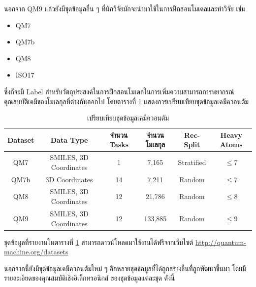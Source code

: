 นอกจาก QM9 แล้วยังมีชุดข้อมูลอื่น ๆ ที่นักวิจัยมักจะนำมาใช้ในการฝึกสอนโมเดลและทำวิจัย เช่น 

\begin{itemize}[topsep=0pt]
    \item QM7\autocite{blum2009,rupp2012}
    
    \item QM7b\autocite{blum2009,montavon2013}
    
    \item QM8\autocite{ruddigkeit2012,ramakrishnan2015}
    
    \item ISO17\autocite{schutt2017,schutt2017a,ramakrishnan2014}
\end{itemize}

\noindent ซึ่งก็จะมี Label สำหรับวัตถุประสงค์ในการฝึกสอนโมเดลในการเพิ่มความสามารถการพยากรณ์คุณสมบัติเคมีของโมเลกุลที่ต่างกันออกไป 
โดยตารางที่ \ref{tab:compare_qm_dataset} แสดงการเปรียบเทียบชุดข้อมูลเคมีควอนตัม

\begin{table}[H]
    \centering
    \caption{เปรียบเทียบชุดข้อมูลเคมีควอนตัม}
    \label{tab:compare_qm_dataset}
    \begin{tabular}{cccccc}
    \toprule
    \textbf{Dataset} &\textbf{Data Type} &\textbf{จำนวน Tasks} &\textbf{จำนวนโมเลกุล} 
    &\textbf{Rec-Split} &\textbf{Heavy Atoms} \\
    \midrule
    QM7 &SMILES, 3D Coordinates &1 &7,165 &Stratified &$\leq$7 \\
    QM7b &3D Coordinates &14 &7,211 &Random &$\leq$7 \\
    QM8 &SMILES, 3D Coordinates &12 &21,786 &Random &$\leq$8 \\
    QM9 &SMILES, 3D Coordinates &12 &133,885 &Random &$\leq$9 \\
    \bottomrule
    \end{tabular}
\end{table}

ชุดข้อมูลที่รายงานในตารางที่ \ref{tab:compare_qm_dataset} สามารถดาวน์โหลดมาใช้งานได้ฟรีจากเว็บไซต์ 
\url{http://quantum-machine.org/datasets} 

นอกจากนี้ยังมีชุดข้อมูลเคมีควอนตัมใหม่ ๆ อีกหลายชุดข้อมูลที่ได้ถูกสร้างขึ้นที่ถูกพัฒนาขึ้นมา โดยมีรายละเอียดของคุณสมบัติเชิงอิเล็กทรอนิกส์%
ของชุดข้อมูลแต่ละชุด ดังนี้

